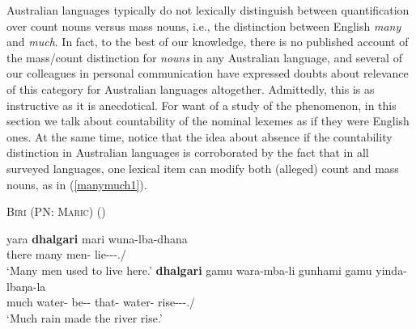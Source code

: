 \documentclass[12pt,egregdoesnotlikesansseriftitles]{scrartcl}
\begin{document}
Australian languages typically do not lexically distinguish between quantification over count nouns versus mass nouns, i.e., the distinction between English \textit{many} and \textit{much}. In fact, to the best of our knowledge, there is no published account of the mass/count distinction for \textit{nouns} in any Australian language, and several of our colleagues in personal communication have expressed doubts about relevance of this category for Australian languages altogether. Admittedly, this is as instructive as it is anecdotical. For want of a study of the phenomenon, in this section we talk about countability of the nominal lexemes as if they were English ones. At the same time, notice that the idea about absence if the countability distinction in Australian languages is corroborated by the fact that in all surveyed languages, one lexical item can %
modify both (alleged) count and mass nouns, as in (\ref{manymuch1}).


\begin{exe}
  \ex \textsc{Biri (PN: Maric}) \hfill(\cite[54]{terrill98}) \label{manymuch1}
  \begin{xlist} 
    \ex \gll  yara    \textbf{dhalgari} mari  wuna-lba-dhana \\
    there  many    men-\Abs{} lie-\Cont-\Pst-\Tpl.\Sarg/\Aarg\\
    \glt `Many men used to live here.'
    \ex \gll \textbf{dhalgari} gamu wara-mba-li gunhami gamu yinda-lbaŋa-la\\
    much  water-\Abs{} be-\Caus-\Pst{} that-\Abs{}  water-\Abs{}  rise-\Cont-\Prs-\Tsg.\Sarg/\Aarg\\
    \glt `Much rain made the river rise.'
  \end{xlist}
\end{exe}
\end{document}
